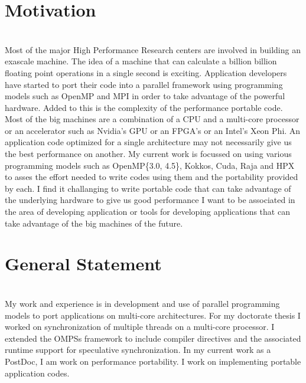 \documentclass[10pt,stdletter,dateno]{newlfm}
\begin{document}
\begin{newlfm}

\section{Motivation}\\
Most of the major High Performance Research centers are involved in building an exascale machine.
The idea of a machine that can calculate a billion billion floating point operations in a single second is exciting.
Application developers have started to port their code into a parallel framework using programming models such as OpenMP and MPI in order to take advantage of the powerful hardware.
Added to this is the complexity of the performance portable code.
Most of the big machines are a combination of a CPU and a multi-core processor or an accelerator such as Nvidia's GPU or an FPGA's or an Intel's Xeon Phi.
An application code optimized for a single architecture may not necessarily give us the best performance on another.
My current work is focussed on using various programming models such as OpenMP\{3.0, 4.5\}, Kokkos, Cuda, Raja and HPX to asses the effort needed to write codes using them and the portability provided by each.
I find it challanging to write portable code that can take advantage of the underlying hardware to give us good performance
I want to be associated in the area of developing application or tools for developing applications that can take advantage of the big machines of the future.

\section{General Statement}\\
My work and experience is in development and use of parallel programming models to port applications on multi-core architectures.\newline\newline
For my doctorate thesis I worked on synchronization of multiple threads on a multi-core processor.
I extended the OMPSs framework to include compiler directives and the associated runtime support for speculative synchronization.\newline\newline
In my current work as a PostDoc, I am work on performance portability. I work on implementing portable application codes. \newline\newline


\end{newlfm}
\end{document}
